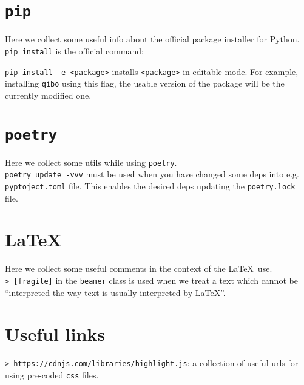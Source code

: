 \documentclass[11pt]{article}
\newcommand{\cmd}[1]{\colorbox{light-gray}{\textcolor{gio}{\texttt{#1}}}}
\begin{document}
\begin{multicols}{2}
\section{\texttt{pip}}

Here we collect some useful info about the official  package installer for Python. \\

\cmd{pip install} is the official command;

\cmd{pip install -e <package>} installs \texttt{<package>} in editable mode. 
For example, installing \texttt{qibo} using this flag, the usable version of the 
package will be the currently modified one.

\section{\texttt{poetry}}

Here we collect some utils while using \texttt{poetry}. \\

\cmd{poetry update -vvv} must be used when you have changed some deps into e.g. 
\texttt{pyptoject.toml} file. This enables the desired deps updating the 
\texttt{poetry.lock} file.

\section{\LaTeX}

Here we collect some useful comments in the context of the \LaTeX$\,$ use. \\

\cmd{> [fragile]} in the \texttt{beamer} class is used when we treat a text which 
cannot be ``interpreted the way text is usually interpreted by \LaTeX''.


\newpage

\section*{Useful links}

\cmd{> \href{https://cdnjs.com/libraries/highlight.js}{https://cdnjs.com/libraries/highlight.js}}:
 a collection of useful urls for using pre-coded \texttt{css} files.

\newpage
\end{multicols}
\end{document}
